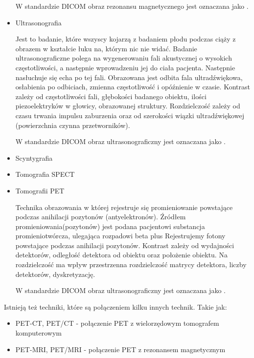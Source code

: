 \begin{itemize}
    W standardzie DICOM obraz rezonansu magnetycznego jest oznaczana jako .
    
    \item Ultrasonografia
    
    Jest to badanie, które wszyscy kojarzą z badaniem płodu podczas ciąży z obrazem w kształcie łuku na, którym nic nie widać.
    Badanie ultrasonograficzne polega na wygenerowaniu fali akustycznej o wysokich częstotliwości, a następnie wprowadzeniu jej do ciała pacjenta.
    Następnie nasłuchuje się echa po tej fali.
    Obrazowana jest odbita fala ultradźwiękowa, osłabienia po odbiciach, zmienna częstotliwość i opóźnienie w czasie.
    Kontrast zależy od częstotliwości fali, głębokości badanego obiektu, ilości piezoelektryków w głowicy, obrazowanej struktury.
    Rozdzielczość zależy od czasu trwania impulsu zaburzenia oraz od szerokości wiązki ultradźwiękowej (powierzchnia czynna przetworników).

    W standardzie DICOM obraz ultrasonograficzny jest oznaczana jako .

    \item Scyntygrafia

    \item Tomografia SPECT

    \item Tomografii PET
    
    Technika obrazowania w której rejestruje się promieniowanie powstające podczas anihilacji pozytonów (antyelektronów).
    Źródłem promieniowania(pozytonów) jest podana pacjentowi substancja promieniotwórcza, ulegająca rozpadowi beta plus
    Rejestrujemy fotony powstające podczas anihilacji pozytonów.
    Kontrast zależy od wydajności detektorów, odległość detektora od obiektu oraz położenie obiektu.
    Na rozdzielczość ma wpływ przestrzenna rozdzielczość matrycy detektora, liczby detektorów, dyskretyzację.

    W standardzie DICOM obraz ultrasonograficzny jest oznaczana jako .
    
\end{itemize}

Istnieją też techniki, które są połączeniem kilku innych technik.
Takie jak:
\begin{itemize}
    \item PET-CT, PET/CT - połączenie PET z wielorzędowym tomografem komputerowym
    \item PET-MRI, PET/MRI - połączenie PET z rezonansem magnetycznym
\end{itemize}

